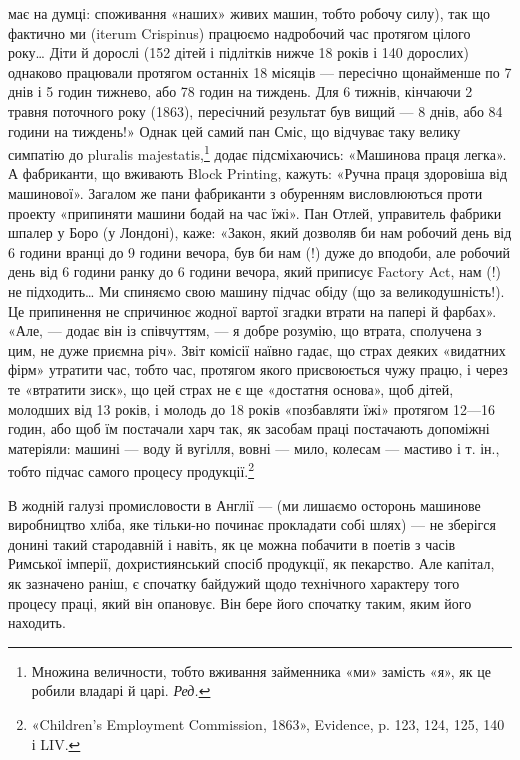 \parcont{}  %
має на думці: споживання «наших» живих машин, тобто робочу
силу), так що фактично ми (iterum Crispinus) працюємо надробочий
час протягом цілого року\dots{} Діти й дорослі (152 дітей і
підлітків нижче 18 років і 140 дорослих) однаково працювали
протягом останніх 18 місяців — пересічно щонайменше по 7 днів
і 5 годин тижнево, або 78 годин на тиждень. Для 6 тижнів,
кінчаючи 2 травня поточного року (1863), пересічний результат
був вищий — 8 днів, або 84 години на тиждень!» Однак  цей самий
пан Сміс, що відчуває таку велику симпатію до pluralis majestatis,\footnote*{
Множина величности, тобто вживання займенника «ми» замість
«я», як це робили владарі й царі. \emph{Ред.}
}
додає підсміхаючись: «Машинова праця легка». А фабриканти,
що вживають Block Printing, кажуть: «Ручна праця
здоровіша від машинової». Загалом же пани фабриканти з обуренням
висловлюються проти проекту «припиняти машини бодай
на час їжі». Пан Отлей, управитель фабрики шпалер у Боро
(у Лондоні), каже: «Закон, який дозволяв би нам робочий день
від 6 години вранці до 9 години вечора, був би нам (!) дуже до вподоби,
але робочий день від 6 години ранку до 6 години вечора,
який приписує Factory Act, нам (!) не підходить\dots{} Ми спиняємо
свою машину підчас обіду (що за великодушність!). Це припинення
не спричинює жодної вартої згадки втрати на папері й фарбах».
«Але, — додає він із співчуттям, — я добре розумію, що втрата,
сполучена з цим, не дуже приємна річ». Звіт комісії наївно гадає,
що страх деяких «видатних фірм» утратити час, тобто час, протягом
якого присвоюється чужу працю, і через те «втратити зиск»,
що цей страх не є ще «достатня основа», щоб дітей, молодших
від 13 років, і молодь до 18 років «позбавляти їжі» протягом
12—16 годин, або щоб їм постачали харч так, як засобам праці
постачають допоміжні матеріяли: машині — воду й вугілля,
вовні — мило, колесам — мастиво і т. ін., тобто підчас самого
процесу продукції.\footnote{
«Children’s Employment Commission, 1863», Evidence, p. 123,
124, 125, 140 і LIV.
}

В жодній галузі промисловости в Англії — (ми лишаємо осторонь
машинове виробництво хліба, яке тільки-но починає прокладати
собі шлях) — не зберігся донині такий стародавній
і навіть, як це можна побачити в поетів з часів Римської імперії,
дохристиянський спосіб продукції, як пекарство. Але капітал,
як зазначено раніш, є спочатку байдужий щодо технічного характеру
того процесу праці, який він опановує. Він бере його
спочатку таким, яким його находить.

